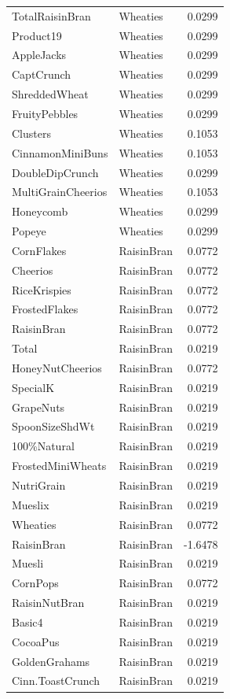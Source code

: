 \begin{longtable}{llr}
TotalRaisinBran & Wheaties & 0.0299 \\
Product19 & Wheaties & 0.0299 \\
AppleJacks & Wheaties & 0.0299 \\
CaptCrunch & Wheaties & 0.0299 \\
ShreddedWheat & Wheaties & 0.0299 \\
FruityPebbles & Wheaties & 0.0299 \\
Clusters & Wheaties & 0.1053 \\
CinnamonMiniBuns & Wheaties & 0.1053 \\
DoubleDipCrunch & Wheaties & 0.0299 \\
MultiGrainCheerios & Wheaties & 0.1053 \\
Honeycomb & Wheaties & 0.0299 \\
Popeye & Wheaties & 0.0299 \\
CornFlakes & RaisinBran & 0.0772 \\
Cheerios & RaisinBran & 0.0772 \\
RiceKrispies & RaisinBran & 0.0772 \\
FrostedFlakes & RaisinBran & 0.0772 \\
RaisinBran & RaisinBran & 0.0772 \\
Total & RaisinBran & 0.0219 \\
HoneyNutCheerios & RaisinBran & 0.0772 \\
SpecialK & RaisinBran & 0.0219 \\
GrapeNuts & RaisinBran & 0.0219 \\
SpoonSizeShdWt & RaisinBran & 0.0219 \\
100\%Natural & RaisinBran & 0.0219 \\
FrostedMiniWheats & RaisinBran & 0.0219 \\
NutriGrain & RaisinBran & 0.0219 \\
Mueslix & RaisinBran & 0.0219 \\
Wheaties & RaisinBran & 0.0772 \\
RaisinBran & RaisinBran & -1.6478 \\
Muesli & RaisinBran & 0.0219 \\
CornPops & RaisinBran & 0.0772 \\
RaisinNutBran & RaisinBran & 0.0219 \\
Basic4 & RaisinBran & 0.0219 \\
CocoaPus & RaisinBran & 0.0219 \\
GoldenGrahams & RaisinBran & 0.0219 \\
Cinn.ToastCrunch & RaisinBran & 0.0219 \\

\end{longtable}
